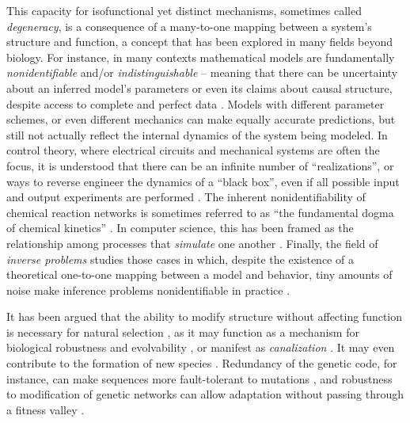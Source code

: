 \documentclass{article}
\newcommand{\1}{\mathbbm{1}}
\begin{document}
This capacity for isofunctional yet distinct mechanisms, sometimes called \emph{degeneracy},
is a consequence of a many-to-one mapping between a system's structure and function,
a concept that has been explored in many fields beyond biology.
For instance, in many contexts mathematical models
are fundamentally \emph{nonidentifiable} and/or \emph{indistinguishable} -- 
meaning that there can be uncertainty about an inferred model's parameters or even its claims about
causal structure, despite access to complete and perfect data \citep[e.g.,][]{bellman1970structural, grewal1976identifiability, walter1984structural}. 
Models with different parameter schemes, or even different mechanics 
can make equally accurate predictions,
but still not actually reflect the internal dynamics of the system being modeled.
In control theory, where electrical circuits and mechanical systems are often the focus, 
it is understood that there can be an infinite number of ``realizations'', 
or ways to reverse engineer the dynamics of a ``black box'',
even if all possible input and output experiments are performed 
\citep{kalman1963mathematical, anderson1966equivalence, zadeh1976linear}. 
The inherent nonidentifiability of chemical reaction networks is sometimes
referred to as ``the fundamental dogma of chemical kinetics'' \citep{craciun2008identifiability}.
In computer science, this has been framed as the relationship among processes that \emph{simulate} one another \citep{van2004equivalence}.
Finally,
the field of \emph{inverse problems} studies those cases in which,
despite the existence of a theoretical one-to-one mapping between a model and behavior,
tiny amounts of noise make inference problems nonidentifiable in practice \citep{petrov2005well}.

It has been argued that the ability to modify structure without affecting function
is necessary for natural selection \citep{edelman2001degeneracy}, 
as it may function as a mechanism for biological robustness and evolvability
\citep[reviewed in][]{devisser2003perspective}, or manifest as 
\emph{canalization} \citep{whitacre2010degeneracy}.
It may even contribute to the formation of new species \citep{gavrilets2014models}. 
Redundancy of the genetic code, for instance,
can make sequences more fault-tolerant to mutations \citep{sonneborn1965degeneracy},
and robustness to modification of genetic networks can allow adaptation 
without passing through a fitness valley \citep{wagner2008robustness}.
\end{document}
